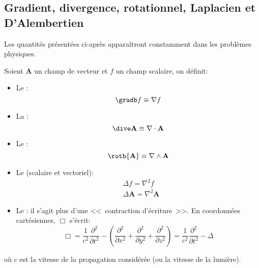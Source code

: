 \medskip
\subsection{Gradient, divergence, rotationnel, Laplacien et D'Alembertien}
Les quantités présentées ci-après apparaîtront constamment dans les
problèmes physiques.%



\medskip
Soient $\mathbf{A} $ un champ de vecteur et $f$ un champ scalaire, on définit:
\begin{itemize}
\item Le :
\begin{equation}  \gradb f  \equiv \nabla f \end{equation}

\item La :
\begin{equation} \dive \mathbf{A}  \equiv \nabla\cdot\mathbf{A}  \end{equation}

\item Le :
\begin{equation} \rotb {\mathbf{A} } \equiv \nabla \wedge \mathbf{A}  \end{equation}

\item Le  (scalaire et vectoriel):
\begin{align} &\Delta f = \nabla^2 f\\
&\Delta \mathbf{A}  = \nabla^2 \mathbf{A} \end{align}

\item Le : il s'agit plus d'une <<~contraction d'écriture~>>.
En coordonnées cartésiennes, $\Box$ s'écrit:
\begin{equation}
    \Box = \frac{1}{c^2}\frac{\partial^2}{\partial t^2} - \left(\frac{\partial^2}{\partial x^2} + \frac{\partial^2}{\partial y^2} + \frac{\partial^2}{\partial z^2}\right)
   = \frac{1}{c^2}\frac{\partial^2}{\partial t^2} - \Delta
\end{equation}
\end{itemize}
où $c$ est la vitesse de la propagation considérée (ou la vitesse de la lumière).

